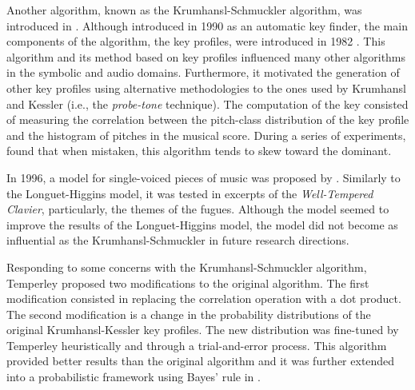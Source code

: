 Another algorithm, known as the Krumhansl-Schmuckler
algorithm, was introduced in
\textcite{krumhansl1990cognitive}. Although introduced in
1990 as an automatic key finder, the main components of the
algorithm, the key profiles, were introduced in 1982
\parencite{krumhansl1982tracing}. This algorithm and its
method based on key profiles influenced many other
algorithms in the symbolic and audio domains. Furthermore,
it motivated the generation of other key profiles using
alternative methodologies to the ones used by Krumhansl and
Kessler (i.e., the \emph{probe-tone} technique). The
computation of the key consisted of measuring the
correlation between the pitch-class distribution of the key
profile and the histogram of pitches in the musical score.
During a series of experiments,
\textcite{sapp2011computational} found that when mistaken,
this algorithm tends to skew toward the dominant.



In 1996, a model for single-voiced pieces of music was
proposed by \textcite{vos1996parallelprocessing}. Similarly
to the Longuet-Higgins model, it was tested in excerpts of
the \emph{Well-Tempered Clavier}, particularly, the themes
of the fugues. Although the model seemed to improve the
results of the Longuet-Higgins model, the model did not
become as influential as the Krumhansl-Schmuckler in future
research directions.



Responding to some concerns with the Krumhansl-Schmuckler
algorithm, Temperley \textcite{temperley1999whats} proposed
two modifications to the original algorithm. The first
modification consisted in replacing the correlation
operation with a dot product. The second modification is a
change in the probability distributions of the original
Krumhansl-Kessler key profiles. The new distribution was
fine-tuned by Temperley heuristically and through a
trial-and-error process. This algorithm provided better
results than the original algorithm and it was further
extended into a probabilistic framework using Bayes' rule in
\textcite{temperley2002bayesian}.



